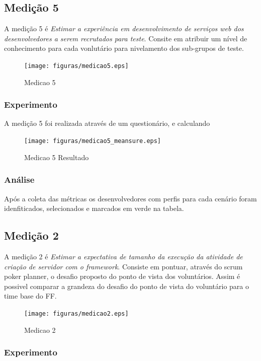 \subsection{Medição 5}

A medição 5 é \textit{Estimar a experiência em desenvolvimento de serviços web dos desenvolvedores a serem recrutados para teste}. Consite em
atribuir um nível de conhecimento para cada vonlutário para nivelamento dos sub-grupos de teste.

\begin{figure}[H]
  \centering
  \label{fig:indicadores}
  \texttt{[image: figuras/medicao5.eps]}
  \caption{Medicao 5}
\end{figure}

\subsubsection{Experimento}

A medição 5 foi realizada através de um questionário, e calculando

\begin{figure}[H]
  \centering
  \label{fig:indicadores}
  \texttt{[image: figuras/medicao5\_meansure.eps]}
  \caption{Medicao 5 Resultado}
\end{figure}

\subsubsection{Análise}
  Após a coleta das métricas os desenvolvedores com perfis para cada cenário foram idenfiticados,  selecionados e marcados em verde na tabela.

\subsection{Medição 2}

A medição 2 é \textit{Estimar a expectativa de tamanho da execução da atividade de criação de servidor com o framework}.
Consiste em pontuar, através do scrum poker planner, o desafio proposto do ponto de vista dos voluntários. Assim é possivel
comparar a grandeza do desafio do ponto de vista do voluntário para o time base do FF.

\begin{figure}[H]
  \centering
  \label{fig:indicadores}
  \texttt{[image: figuras/medicao2.eps]}
  \caption{Medicao 2}
\end{figure}

\subsubsection{Experimento}


